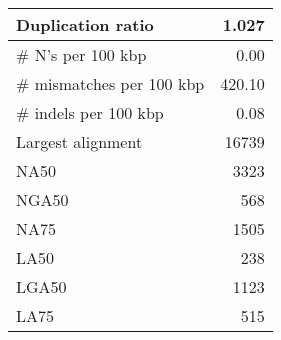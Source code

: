 \documentclass[12pt,a4paper]{article}
\begin{document}
\begin{table}[ht]
\begin{center}
\begin{tabular}{|l*{1}{|r}|}
Duplication ratio & 1.027 \\ \hline
\# N's per 100 kbp & 0.00 \\ \hline
\# mismatches per 100 kbp & 420.10 \\ \hline
\# indels per 100 kbp & 0.08 \\ \hline
Largest alignment & 16739 \\ \hline
NA50 & 3323 \\ \hline
NGA50 & 568 \\ \hline
NA75 & 1505 \\ \hline
LA50 & 238 \\ \hline
LGA50 & 1123 \\ \hline
LA75 & 515 \\ \hline
\end{tabular}
\end{center}
\end{table}
\end{document}
